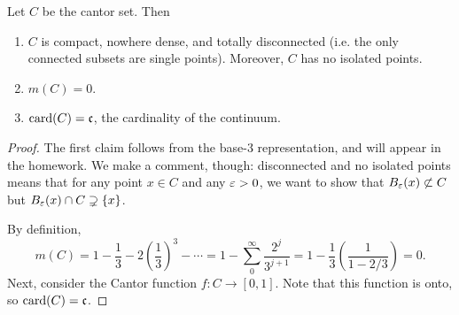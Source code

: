 \documentclass[12pt]{article} %
\begin{document}
\begin{proposition}
    Let $C$ be the cantor set. Then \begin{enumerate}
        \item $C$ is compact, nowhere dense, and totally disconnected (i.e. the only connected subsets are single points). Moreover, $C$ has no isolated points.
        \item $m(C) = 0$.
        \item $\operatorname{card}(C) = \mathfrak{c}$, the cardinality of the continuum.
    \end{enumerate}
\end{proposition}

\begin{proof}
    The first claim follows from the base-3 representation, and will appear in the homework. We make a comment, though: disconnected and no isolated points means that for any point $x \in C$ and any $\varepsilon > 0$, we want to show that $B_\varepsilon(x) \not\subset C$ but $B_\varepsilon(x) \cap C \supsetneq \{x\}$.

    By definition, \[m(C) = 1 - \frac{1}{3} - 2\left(\frac{1}{3}\right)^3 - \cdots = 1 - \sum_0^\infty \frac{2^j}{3^{j+1}} = 1 - \frac{1}{3} \left(\frac{1}{1 - 2/3}\right) = 0.\] Next, consider the Cantor function $f : C \to [0,1]$. Note that this function is onto, so $\operatorname{card}(C) = \mathfrak{c}$.
\end{proof}
\end{document}
